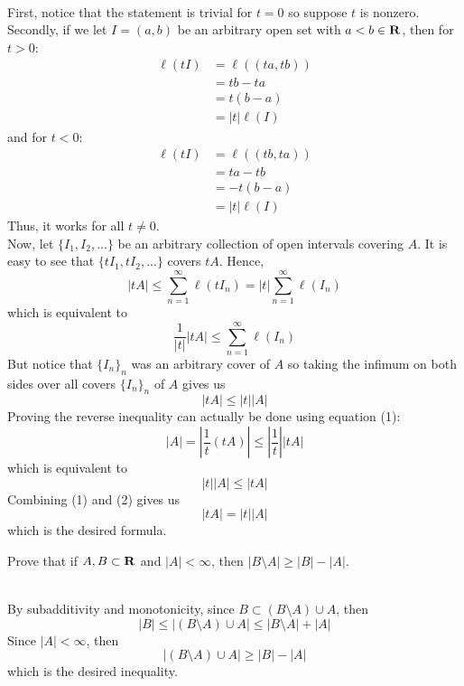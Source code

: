 \begin{solution}
    \\ First, notice that the statement is trivial for $t = 0$ so suppose $t$ is nonzero. Secondly, if we let $I = (a,b)$ be an arbitrary open set with $a < b \in \mathbf{R}$, then for $t > 0$:
    \begin{align*}
        \ell(tI) &= \ell((ta, tb)) \\
        &= tb - ta \\
        &= t(b-a) \\
        &= |t|\ell(I)
    \end{align*}
    and for $t < 0$:
    \begin{align*}
        \ell(tI) &= \ell((tb, ta)) \\
        &= ta - tb \\
        &= -t(b-a) \\
        &= |t|\ell(I)
    \end{align*}
    Thus, it works for all $t \neq 0$.\\
    Now, let $\{I_1, I_2, ...\}$ be an arbitrary collection of open intervals covering $A$. It is easy to see that $\{tI_1, tI_2, ...\}$ covers $tA$. Hence,
    $$|tA| \leq \sum_{n=1}^{\infty}\ell(tI_n) = |t|\sum_{n=1}^{\infty}\ell(I_n)$$
    which is equivalent to
    $$\frac{1}{|t|}|tA| \leq \sum_{n=1}^{\infty}\ell(I_n)$$
    But notice that $\{I_n\}_n$ was an arbitrary cover of $A$ so taking the infimum on both sides over all covers $\{I_n\}_n$ of $A$ gives us
    \[|tA| \leq |t||A| \tag*{(1)}\]
    Proving the reverse inequality can actually be done using equation (1):
    $$|A| = \left|\frac{1}{t}(tA)\right| \leq \left|\frac{1}{t}\right| |tA|$$
    which is equivalent to
    \[|t||A| \leq |tA| \tag*{(2)}\]
    Combining (1) and (2) gives us
    $$|tA| = |t||A|$$
    which is the desired formula. \\
\end{solution}

\begin{exercise}
    Prove that if $A,B \subset \mathbf{R}$ and $|A| < \infty$, then $|B \setminus A| \geq |B| - |A|$. \\
\end{exercise}

\begin{solution}
    \\ By subadditivity and monotonicity, since $B \subset (B\setminus A)\cup A$, then
    $$|B| \leq |(B\setminus A)\cup A| \leq |B\setminus A| + |A|$$
    Since $|A| < \infty$, then
    $$|(B\setminus A)\cup A| \geq |B| - |A|$$
    which is the desired inequality. \\
\end{solution}


